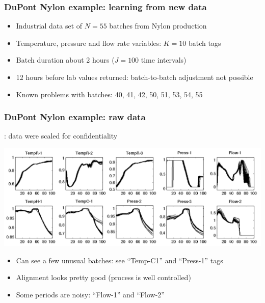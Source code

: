 \begin{frame}\frametitle{DuPont Nylon example: learning from new data}

	\begin{itemize}
		\item	Industrial data set of \( N = 55 \) batches from Nylon production
		
		\item	Temperature, pressure and flow rate variables: \( K = 10\)  batch tags
		
		\item	Batch duration about 2 hours (\( J=100 \) time intervals)
		
		\item	12 hours before lab values returned: batch-to-batch adjustment not possible
		
		\item	Known problems with batches: 40, 41, 42, 50, 51, 53, 54, 55
	\end{itemize}
	
	
\end{frame}

\begin{frame}\frametitle{DuPont Nylon example: raw data}
	{\color{myGreen}{Note}}: data were scaled for confidentiality
	\begin{center}
		\includegraphics[width=\textwidth]{images/dupont/dupont-raw-data-trajectories.png}
	\end{center}
	
	\vspace{1cm}
	\begin{itemize}
		\item	Can see a few unusual batches: see ``Temp-C1'' and ``Press-1'' tags
		
		\item	Alignment looks pretty good (process is well controlled)
		
		\item	Some periods are noisy: ``Flow-1'' and ``Flow-2''
	\end{itemize}
\end{frame}

